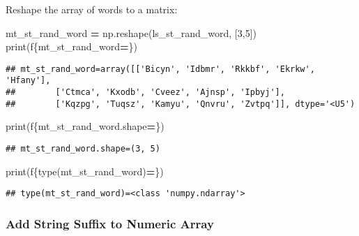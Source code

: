 \documentclass[
]{book}
\newenvironment{Shaded}{\begin{snugshade}}{\end{snugshade}}
\newcommand{\BuiltInTok}[1]{#1}
\newcommand{\DecValTok}[1]{\textcolor[rgb]{0.00,0.00,0.81}{#1}}
\newcommand{\NormalTok}[1]{#1}
\newcommand{\OperatorTok}[1]{\textcolor[rgb]{0.81,0.36,0.00}{\textbf{#1}}}
\newcommand{\SpecialCharTok}[1]{\textcolor[rgb]{0.00,0.00,0.00}{#1}}
\newcommand{\SpecialStringTok}[1]{\textcolor[rgb]{0.31,0.60,0.02}{#1}}
\begin{document}
Reshape the array of words to a matrix:

\begin{Shaded}
\begin{Highlighting}[]
\NormalTok{mt\_st\_rand\_word }\OperatorTok{=}\NormalTok{ np.reshape(ls\_st\_rand\_word, [}\DecValTok{3}\NormalTok{,}\DecValTok{5}\NormalTok{])}
\BuiltInTok{print}\NormalTok{(}\SpecialStringTok{f\textquotesingle{}}\SpecialCharTok{\{}\NormalTok{mt\_st\_rand\_word}\OperatorTok{=}\SpecialCharTok{\}}\SpecialStringTok{\textquotesingle{}}\NormalTok{)}
\end{Highlighting}
\end{Shaded}

\begin{verbatim}
## mt_st_rand_word=array([['Bicyn', 'Idbmr', 'Rkkbf', 'Ekrkw', 'Hfany'],
##        ['Ctmca', 'Kxodb', 'Cveez', 'Ajnsp', 'Ipbyj'],
##        ['Kqzpg', 'Tuqsz', 'Kamyu', 'Qnvru', 'Zvtpq']], dtype='<U5')
\end{verbatim}

\begin{Shaded}
\begin{Highlighting}[]
\BuiltInTok{print}\NormalTok{(}\SpecialStringTok{f\textquotesingle{}}\SpecialCharTok{\{}\NormalTok{mt\_st\_rand\_word}\SpecialCharTok{.}\NormalTok{shape}\OperatorTok{=}\SpecialCharTok{\}}\SpecialStringTok{\textquotesingle{}}\NormalTok{)}
\end{Highlighting}
\end{Shaded}

\begin{verbatim}
## mt_st_rand_word.shape=(3, 5)
\end{verbatim}

\begin{Shaded}
\begin{Highlighting}[]
\BuiltInTok{print}\NormalTok{(}\SpecialStringTok{f\textquotesingle{}}\SpecialCharTok{\{}\BuiltInTok{type}\NormalTok{(mt\_st\_rand\_word)}\OperatorTok{=}\SpecialCharTok{\}}\SpecialStringTok{\textquotesingle{}}\NormalTok{)}
\end{Highlighting}
\end{Shaded}

\begin{verbatim}
## type(mt_st_rand_word)=<class 'numpy.ndarray'>
\end{verbatim}

\hypertarget{add-string-suffix-to-numeric-array}{%
\subsubsection{Add String Suffix to Numeric Array}\label{add-string-suffix-to-numeric-array}}
\end{document}
